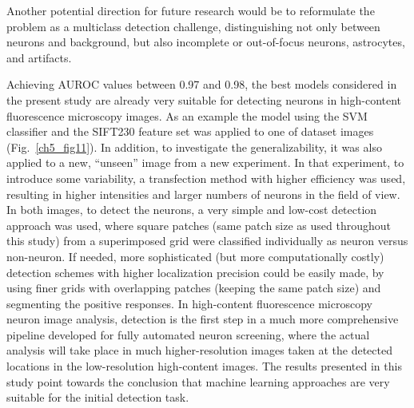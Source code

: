  
Another potential direction for future research would be to reformulate the problem as a multiclass detection challenge, distinguishing not only between neurons and background, but also incomplete or out-of-focus neurons, astrocytes, and artifacts.

Achieving AUROC values between 0.97 and 0.98, the best models considered in the present study are already very suitable for detecting neurons in high-content fluorescence microscopy images. As an example the model using the SVM classifier and the SIFT230 feature set was applied to one of dataset images (Fig.~\ref{ch5_fig11}). In addition, to investigate the generalizability, it was also applied to a new, ``unseen'' image from a new experiment. In that experiment, to introduce some variability, a transfection method with higher efficiency \cite{bredenbeek1993sindbis} was used, resulting in higher intensities and larger numbers of neurons in the field of view. In both images, to detect the neurons, a very simple and low-cost detection approach was used, where square patches (same patch size as used throughout this study) from a superimposed grid were classified individually as neuron versus non-neuron. If needed, more sophisticated (but more computationally costly) detection schemes with higher localization precision could be easily made, by using finer grids with overlapping patches (keeping the same patch size) and segmenting the positive responses. In high-content fluorescence microscopy neuron image analysis, detection is the first step in a much more comprehensive pipeline developed for fully automated neuron screening, where the actual analysis will take place in much higher-resolution images taken at the detected locations in the low-resolution high-content images. The results presented in this study point towards the conclusion that machine learning approaches are very suitable for the initial detection task.

